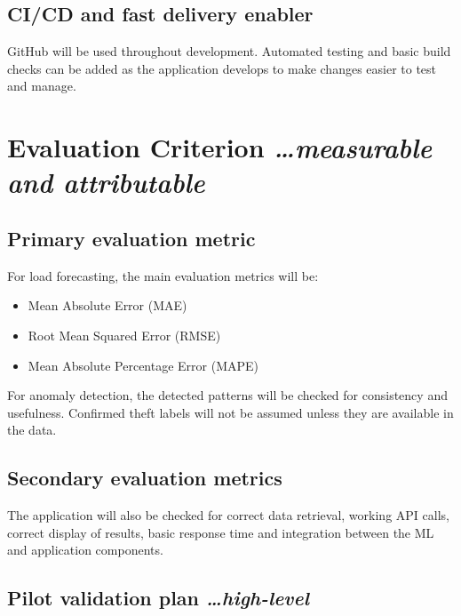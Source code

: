 \documentclass[11pt,a4paper]{article}
\newcommand{\BvrHint}[1]{%
  {\normalfont\normalsize\itshape\hfill #1}}
\begin{document}
\subsection{CI/CD and fast delivery enabler}

GitHub will be used throughout development. Automated testing and
basic build checks can be added as the application develops to make
changes easier to test and manage.

\section{Evaluation Criterion %
  \BvrHint{\ldots measurable and attributable}}

\subsection{Primary evaluation metric}

For load forecasting, the main evaluation metrics will be:

\begin{itemize}[leftmargin=0.7cm]

    \item Mean Absolute Error (MAE)

    \item Root Mean Squared Error (RMSE)

    \item Mean Absolute Percentage Error (MAPE)

\end{itemize}

For anomaly detection, the detected patterns will be checked for
consistency and usefulness. Confirmed theft labels will not be
assumed unless they are available in the data.

\subsection{Secondary evaluation metrics}

The application will also be checked for correct data retrieval,
working API calls, correct display of results, basic response time
and integration between the ML and application components.

\subsection{Pilot validation plan %
  \BvrHint{\ldots high-level}}
\end{document}

